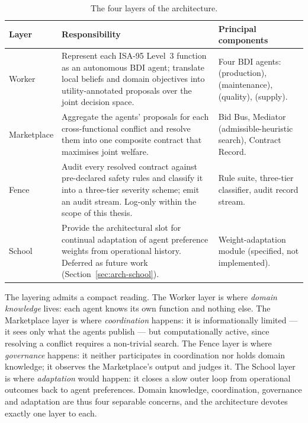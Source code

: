 \begin{table}[ht]
\centering
\caption{The four layers of the \NEXUS{} architecture.}
\label{tab:layers}
\small
\begin{tabularx}{\textwidth}{@{}l X X@{}}
\toprule
\textbf{Layer} & \textbf{Responsibility} & \textbf{Principal components} \\
\midrule
Worker &
  Represent each ISA-95 Level~3 function as an autonomous BDI agent;
  translate local beliefs and domain objectives into utility-annotated
  proposals over the joint decision space. &
  Four BDI agents: \PSA{} (production), \PMA{} (maintenance),
  \QCA{} (quality), \SCA{} (supply). \\
\addlinespace
Marketplace &
  Aggregate the agents' proposals for each cross-functional conflict and
  resolve them into one composite contract that maximises joint
  welfare. &
  Bid Bus, Mediator (admissible-heuristic search), Contract Record. \\
\addlinespace
Fence &
  Audit every resolved contract against pre-declared safety rules and
  classify it into a three-tier severity scheme; emit an audit stream.
  Log-only within the scope of this thesis. &
  Rule suite, three-tier classifier, audit record stream. \\
\addlinespace
School &
  Provide the architectural slot for continual adaptation of agent
  preference weights from operational history. Deferred as future work
  (Section~\ref{sec:arch-school}). &
  Weight-adaptation module (specified, not implemented). \\
\bottomrule
\end{tabularx}
\end{table}

The layering admits a compact reading. The Worker layer is where
\emph{domain knowledge} lives: each agent knows its own function and
nothing else. The Marketplace layer is where \emph{coordination}
happens: it is informationally limited --- it sees only what the agents
publish --- but computationally active, since resolving a conflict
requires a non-trivial search. The Fence layer is where
\emph{governance} happens: it neither participates in coordination nor
holds domain knowledge; it observes the Marketplace's output and judges
it. The School layer is where \emph{adaptation} would happen: it closes
a slow outer loop from operational outcomes back to agent preferences.
Domain knowledge, coordination, governance and adaptation are thus four
separable concerns, and the architecture devotes exactly one layer to
each.

